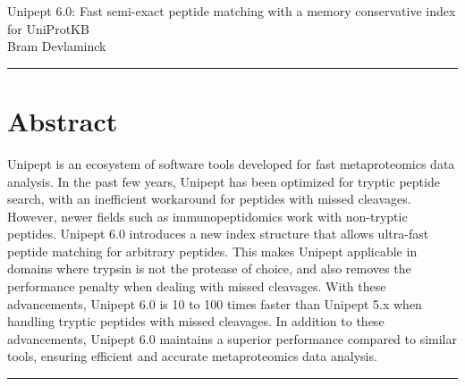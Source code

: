 \documentclass[11pt]{article}
\begin{document}
    \begingroup
    \centering
    \LARGE Unipept 6.0: Fast semi-exact peptide matching with a memory conservative index for UniProtKB\\[1em]
    \large Bram Devlaminck\\[2em]
    \endgroup

    \par\noindent\rule{\linewidth}{.5pt}
    \section*{Abstract}\label{sec:test-section}
    Unipept is an ecosystem of software tools developed for fast metaproteomics data analysis.
    In the past few years, Unipept has been optimized for tryptic peptide search, with an inefficient workaround for peptides with missed cleavages.
    However, newer fields such as immunopeptidomics work with non-tryptic peptides.
    Unipept 6.0 introduces a new index structure that allows ultra-fast peptide matching for arbitrary peptides.
    This makes Unipept applicable in domains where trypsin is not the protease of choice, and also removes the performance penalty when dealing with missed cleavages.
    With these advancements, Unipept 6.0 is 10 to 100 times faster than Unipept 5.x when handling tryptic peptides with missed cleavages.
    In addition to these advancements, Unipept 6.0 maintains a superior performance compared to similar tools, ensuring efficient and accurate metaproteomics data analysis.
    \par\noindent\rule{\linewidth}{.5pt} %
\end{document}
